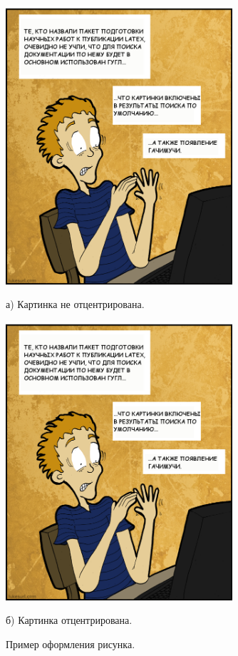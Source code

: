 \documentclass[14pt, russian]{scrartcl}
\begin{document}
\begin{figure}[!htb]
\centering
  \begin{minipage}[t]{.4\textwidth}
\includegraphics[width=0.75\textwidth]{google_latex.png}
  \caption*{а) Картинка не отцентрирована.}
  \end{minipage}
  \noindent
  \begin{minipage}[t]{.55\textwidth}
  \centering
\includegraphics[width=0.75\textwidth]{google_latex.png}
  \caption*{б) Картинка отцентрирована.}
  \end{minipage}
\caption{Пример оформления рисунка.}
\label{fig:example1}
\end{figure}
\end{document}
